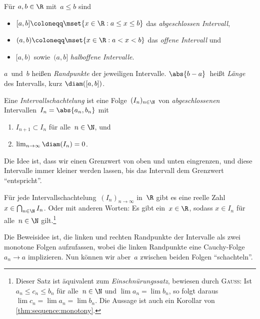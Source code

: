 \documentclass[a4paper]{article}
\begin{document}
\begin{definition}[Intervall]\label{def:interval}
    Für $a, b \in \R$ mit~$a \leq b$ sind
    \begin{itemize}
        \item $[a, b] \coloneqq \mset{x \in \R : a \leq x \leq b}$ das \emph{abgeschlossen Intervall},
        \item $(a, b) \coloneqq \mset{x \in \R : a < x < b}$ das \emph{offene Intervall} und
        \item $[a, b)$~sowie~$(a, b]$ \emph{halboffene Intervalle}.
    \end{itemize}

    $a$~und~$b$ heißen \emph{Randpunkte} der jeweiligen Intervalle. $\abs{b-a}$~heißt \emph{Länge} des Intervalls, kurz $\diam([a, b])$.
\end{definition}

\begin{definition}[Intervallschatelung]
    Eine \emph{Intervallschachtelung} ist eine Folge~$(I_n)_{n \in \N}$ von \emph{abgeschlossenen} Intervallen~$I_n = \abs{a_n, b_n}$ mit
    \begin{enumerate}
        \item $I_{n+1} \subset I_n$ für alle~$n \in \N$, und
        \item $\lim_{n\to\infty} \diam(I_n) = 0$.
    \end{enumerate}
\end{definition}

Die Idee ist, dass wir einen Grenzwert von oben und unten eingrenzen, und diese Intervalle immer kleiner werden lassen, bis das Intervall dem Grenzwert "`entspricht"'.

\begin{theorem}[Intervallschachtelungsprinzip]
    Für jede Intervallschachtelung~$(I_n)_{n\to\infty}$ in~$\R$ gibt es eine reelle Zahl $x \in \bigcap_{n\in\N} I_n$. Oder mit anderen Worten: Es gibt ein~$x \in \R$, sodass $x \in I_n$ für alle~$n \in \N$ gilt.\footnote{Dieser Satz ist äquivalent zum \emph{Einschnürungssatz}, bewiesen durch \textsc{Gauß}: Ist $a_n \leq c_n \leq b_n$ für alle~$n \in \N$ und $\lim a_n = \lim b_n$, so folgt daraus $\lim c_n = \lim a_n = \lim b_n$. Die Aussage ist auch ein Korollar von \cref{thm:sequence:monotony}.}
\end{theorem}

Die Beweisidee ist, die linken und rechten Randpunkte der Intervalle als zwei monotone Folgen aufzufassen, wobei die linken Randpunkte eine Cauchy-Folge~$a_n \to a$ implizieren. Nun können wir aber~$a$ zwischen beiden Folgen "`schachteln"'.
\end{document}
